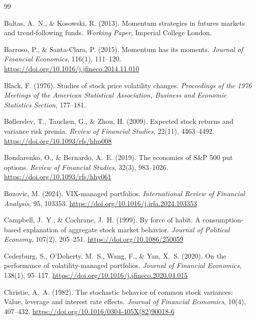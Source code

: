 
\begin{thebibliography}{99}

Baltas, A.~N., \& Kosowski, R. (2013). Momentum strategies in futures markets and trend-following funds. \textit{Working Paper}, Imperial College London.

Barroso, P., \& Santa-Clara, P. (2015). Momentum has its moments. \textit{Journal of Financial Economics}, 116(1), 111--120. \url{https://doi.org/10.1016/j.jfineco.2014.11.010}

Black, F. (1976). Studies of stock price volatility changes. \textit{Proceedings of the 1976 Meetings of the American Statistical Association, Business and Economic Statistics Section}, 177--181.

Bollerslev, T., Tauchen, G., \& Zhou, H. (2009). Expected stock returns and variance risk premia. \textit{Review of Financial Studies}, 22(11), 4463--4492. \url{https://doi.org/10.1093/rfs/hhp008}

Bondarenko, O., \& Bernardo, A.~E. (2019). The economics of S\&P 500 put options. \textit{Review of Financial Studies}, 32(3), 983--1026. \url{https://doi.org/10.1093/rfs/hhy061}

Bozovic, M. (2024). VIX-managed portfolios. \textit{International Review of Financial Analysis}, 95, 103353. \url{https://doi.org/10.1016/j.irfa.2024.103353}

Campbell, J.~Y., \& Cochrane, J.~H. (1999). By force of habit: A consumption-based explanation of aggregate stock market behavior. \textit{Journal of Political Economy}, 107(2), 205--251. \url{https://doi.org/10.1086/250059}

Cederburg, S., O'Doherty, M.~S., Wang, F., \& Yan, X.~S. (2020). On the performance of volatility-managed portfolios. \textit{Journal of Financial Economics}, 138(1), 95--117. \url{https://doi.org/10.1016/j.jfineco.2020.04.015}

Christie, A.~A. (1982). The stochastic behavior of common stock variances: Value, leverage and interest rate effects. \textit{Journal of Financial Economics}, 10(4), 407--432. \url{https://doi.org/10.1016/0304-405X(82)90018-6}


\end{thebibliography}
